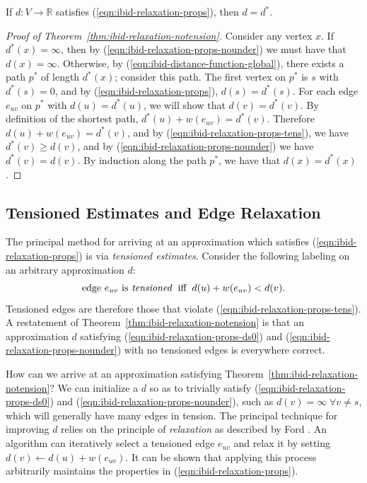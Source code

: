 \begin{theorem}
If $d: V \rightarrow \mathbb{R}$
satisfies (\ref{eqn:ibid-relaxation-props}),
then $d = d^*$.
\label{thm:ibid-relaxation-notension}
\end{theorem}

\begin{proof}[Proof of Theorem~\ref{thm:ibid-relaxation-notension}]
Consider any vertex $x$.
If $d^*(x) = \infty$,
then by (\ref{eqn:ibid-relaxation-props-nounder}) we must have that
$d(x) = \infty$.
Otherwise,
by (\ref{eqn:ibid-distance-function-global}),
there exists a path $p^*$ of length $d^*(x)$;
consider this path.
The first vertex on $p^*$ is $s$ with $d^*(s) = 0$,
and by (\ref{eqn:ibid-relaxation-props}),
$d(s) = d^*(s)$.
For each edge $e_{uv}$ on $p^*$ with $d(u) = d^*(u)$,
we will show that $d(v) = d^*(v)$.
By definition of the shortest path,
$d^*(u) + w(e_{uv}) = d^*(v)$.
Therefore $d(u) + w(e_{uv}) = d^*(v)$,
and by (\ref{eqn:ibid-relaxation-props-tens}),
we have $d^*(v) \geq d(v)$,
and by (\ref{eqn:ibid-relaxation-props-nounder})
we have $d^*(v) = d(v)$.
By induction along the path $p^*$,
we have that $d(x) = d^*(x)$.
\end{proof}

\subsection{Tensioned Estimates and Edge Relaxation}

The principal method for arriving at an approximation
which satisfies (\ref{eqn:ibid-relaxation-props})
is via \emph{tensioned estimates}.
Consider the following labeling on an arbitrary approximation $d$:
\begin{equation}
   \mbox{edge } e_{uv} \mbox{ is \emph{tensioned}}
   \;\;\mbox{iff}\;\;
   d(u) + w(e_{uv}) < d(v).
   \label{eqn:ibid-relaxation-tensioned}
\end{equation}
Tensioned edges are therefore those that violate
(\ref{eqn:ibid-relaxation-props-tens}).
A restatement of Theorem~\ref{thm:ibid-relaxation-notension}
is that an approximation $d$
satisfying (\ref{eqn:ibid-relaxation-props-ds0})
and (\ref{eqn:ibid-relaxation-props-nounder})
with no tensioned edges is everywhere correct.

How can we arrive at an approximation
satisfying Theorem~\ref{thm:ibid-relaxation-notension}?
We can initialize a $d$ so as to trivially
satisfy (\ref{eqn:ibid-relaxation-props-ds0})
and (\ref{eqn:ibid-relaxation-props-nounder}),
such as $d(v) = \infty \;\forall v \neq s$,
which will generally have many edges in tension.
The principal technique for improving $d$ relies on the principle of
\emph{relaxation}
as described by Ford \citep{ford1955networkflowtheory}.
An algorithm can iteratively select a tensioned edge $e_{uv}$
and relax it by setting
$d(v) \leftarrow d(u) + w(e_{uv})$.
It can be shown that applying this process arbitrarily
maintains the properties in (\ref{eqn:ibid-relaxation-props}).

